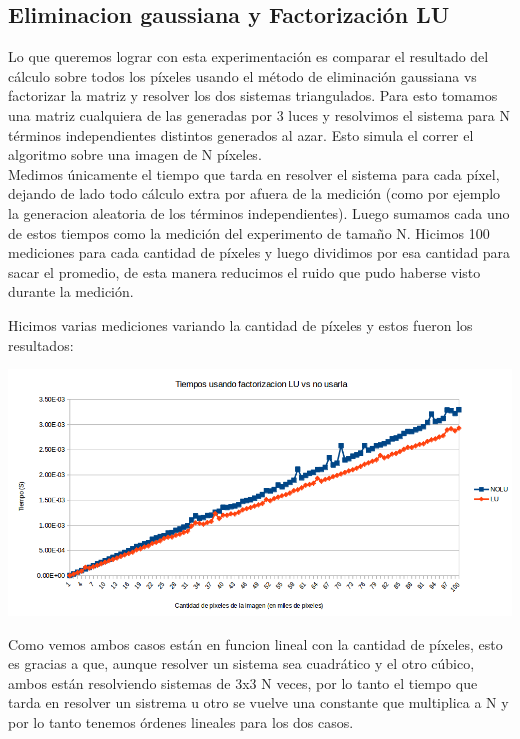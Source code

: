 \newpage
\subsection{Eliminacion gaussiana y Factorización LU}

Lo que queremos lograr con esta experimentación es comparar el resultado del cálculo sobre todos los píxeles usando el método de eliminación gaussiana vs factorizar la matriz y resolver los dos sistemas triangulados.
Para esto tomamos una matriz cualquiera de las generadas por 3 luces y resolvimos el sistema para N términos independientes distintos generados al azar. Esto simula el correr el algoritmo sobre una imagen de N píxeles.\\

Medimos únicamente el tiempo que tarda en resolver el sistema para cada píxel, dejando de lado todo cálculo extra por afuera de la medición (como por ejemplo la generacion aleatoria de los términos independientes). Luego sumamos cada uno de estos tiempos como la medición del experimento de tamaño N.
Hicimos 100 mediciones para cada cantidad de píxeles y luego dividimos por esa cantidad para sacar el promedio, de esta manera reducimos el ruido que pudo haberse visto durante la medición.

Hicimos varias mediciones variando la cantidad de píxeles y estos fueron los resultados:

{\centering
    \includegraphics[scale=0.7]{informe/imagenes/LUVSNOLU.PNG} \\
}

Como vemos ambos casos están en funcion lineal con la cantidad de píxeles, esto es gracias a que, aunque resolver un sistema sea cuadrático y el otro cúbico, ambos están resolviendo sistemas de 3x3 N veces, por lo tanto el tiempo que tarda en resolver un sistrema u otro se vuelve una constante que multiplica a N y por lo tanto tenemos órdenes lineales para los dos casos.\\

